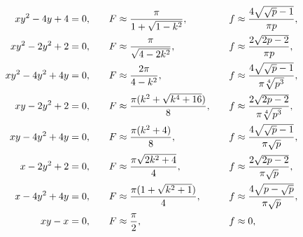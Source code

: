 \begin{alignat}{3}


xy^2-4y+4&=0,  & \quad


F&\approx\frac{\pi}{1+\sqrt{1-k^2}}, & \quad


f&\approx\frac{4\sqrt{\sqrt p-1}}{\pi p}, \\


%


xy^2-2y^2+2&=0, &\quad


F&\approx\frac{\pi}{\sqrt{4-2k^2}}, & \quad


f&\approx\frac{2\sqrt{2p-2}}{\pi p}, \\


%


xy^2-4y^2+4y&=0, & \quad


F&\approx\frac{2\pi}{4-k^2}, & \quad


f&\approx\frac{4\sqrt{\sqrt p-1}}{\pi\sqrt[4]{p^3}}, \\


%


xy-2y^2+2&=0, & \quad


F&\approx\frac{\pi(k^2+\sqrt{k^4+16})}{8}, & \quad


f&\approx\frac{2\sqrt{2p-2}}{\pi\sqrt[4]{p^3}}, \\


%


xy-4y^2+4y&=0, & \quad


F&\approx\frac{\pi(k^2+4)}{8}, & \quad


f&\approx\frac{4\sqrt{\sqrt p-1}}{\pi\sqrt p}, \\


%


x-2y^2+2&=0, & \quad


F&\approx\frac{\pi\sqrt{2k^2+4}}{4}, & \quad


f&\approx\frac{2\sqrt{2p-2}}{\pi\sqrt p}, \\


%


x-4y^2+4y&=0, & \quad


F&\approx\frac{\pi(1+\sqrt{k^2+1})}{4}, & \quad


f&\approx\frac{4\sqrt{p-\sqrt p}}{\pi\sqrt p}, \notag \\


%


xy-x&=0, & \quad


F&\approx\frac{\pi}{2}, & \quad


f&\approx0,\notag


\end{alignat} 


